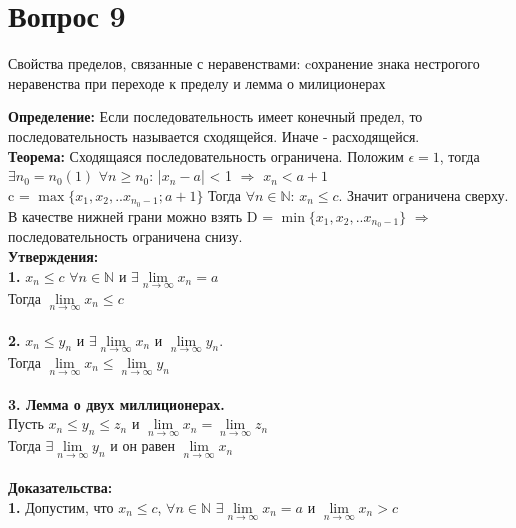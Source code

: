 \documentclass{article}
\DeclareMathOperator{\Exists}{\exists}
\DeclareMathOperator{\Forall}{\forall}
\begin{document}
\section*{Вопрос 9}
 
\begin{center}
   {Свойства пределов, связанные с неравенствами: cохранение знака нестрогого неравенства при переходе к пределу и лемма о милиционерах} \\
\end{center}
 
   \textbf{Определение: } Если последовательность имеет конечный предел, то последовательность называется сходящейся. Иначе - расходящейся.\\
   \textbf{Теорема: } Сходящаяся последовательность ограничена.
   Положим $\epsilon = 1$, тогда $\Exists n_0 = n_0(1)$ $\Forall n \geq n_0$: |$x_n - a$| < 1 $\Rightarrow$ $x_n < a + 1$ \\
   c = $\max \{x_1, x_2, .. x_{n_0 - 1}; a + 1 \}$
   Тогда  $\Forall n \in \mathbb{N}$: $x_n \leq c$. Значит ограничена сверху. \\
   В качестве нижней грани можно взять D = $\min \{ x_1, x_2, ..x_{n_0 - 1} \}$ $\Rightarrow$ последовательность ограничена снизу.
   \\
   \textbf{Утверждения: }\\
   \textbf{1.} $x_n \leq c$ $\Forall n \in \mathbb{N}$ и $\Exists \lim\limits_{n \to \infty} {x_n} = a$\\
   Тогда $\lim\limits_{n \to \infty} {x_n} \leq c$\\
   \\
   \textbf{2.} $x_n \leq y_n$ и $\Exists \lim\limits_{n \to \infty} {x_n}$ и $\lim\limits_{n \to \infty} {y_n}$. \\
   Тогда $\lim\limits_{n \to \infty} {x_n} \leq \lim\limits_{n \to \infty} {y_n}$\\
   \\
   \textbf{3. Лемма о двух миллиционерах.}\\
   Пусть $x_n \leq y_n \leq z_n$ и $\lim\limits_{n \to \infty} {x_n} = \lim\limits_{n \to \infty} {z_n}$ \\
   Тогда $\Exists \lim\limits_{n \to \infty} {y_n}$ и он равен $\lim\limits_{n \to \infty} {x_n}$ \\
   \\
   \textbf{Доказательства: }\\
   \textbf{1.} Допустим, что $x_n \leq c$, $\Forall n \in \mathbb{N}$ $\Exists \lim\limits_{n \to \infty} {x_n} = a$ и $\lim\limits_{n \to \infty} {x_n} > c$ \\
\end{document}
